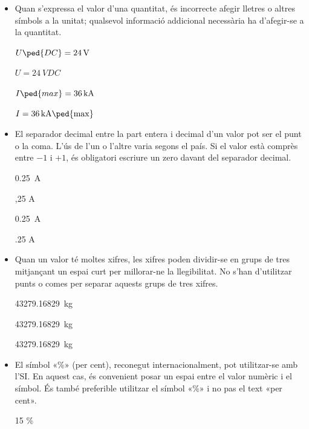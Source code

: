 \begin{itemize}
\textcolor{Red}\faTimesCircle{}   \qty{2,55}{d}

\textcolor{Green}\faCheckSquare{} \ang{22,04}

\textcolor{Blue}\faExclamationTriangle{} \ang{22;2;24}


\item Quan s'expressa el valor d'una quantitat, és incorrecte afegir
lletres o altres símbols a la unitat; qualsevol informació
addicional necessària ha d'afegir-se a la quantitat.

\textcolor{Green}\faCheckSquare{} $U\ped{DC} =\qty{24}{V}$

\textcolor{Red}\faTimesCircle{} $U = \qty{24}{VDC}$

\textcolor{Green}\faCheckSquare{}  $I\ped{max} = \qty{36}{kA}$

\textcolor{Red}\faTimesCircle{}   $I = \qty{36}{kA\ped{max}}$


\item El separador decimal entre la part entera i decimal d'un valor pot ser el punt o la coma. L'ús de l'un o l'altre varia segons el país. Si el valor està comprès entre $-1$ i $+1$, és obligatori escriure un zero davant del separador decimal.

\textcolor{Green}\faCheckSquare{} \qty{0,25}{A}

\textcolor{Red}\faTimesCircle{}  ,25 A

\textcolor{Green}\faCheckSquare{} \qty[output-decimal-marker = {.}]{0.25}{A}

\textcolor{Red}\faTimesCircle{}  .25 A


\item Quan un valor té moltes xifres, les xifres poden dividir-se en grups de tres mitjançant un espai curt per millorar-ne la llegibilitat. No s'han d'utilitzar punts o comes per separar aquests grups de tres xifres.

\textcolor{Green}\faCheckSquare{} \qty{43279,16829}{kg}

\textcolor{Green}\faCheckSquare{} \qty[group-separator =]{43279,16829}{kg}

\textcolor{Red}\faTimesCircle{}  \qty[group-separator = .]{43279,16829}{kg}

\item El símbol «\%» (per cent), reconegut internacionalment, pot utilitzar-se amb l'SI. En aquest cas, és convenient posar un espai entre el valor numèric i el símbol. És també preferible utilitzar el símbol «\%» i no pas el text  «per cent».

\textcolor{Green}\faCheckSquare{} 15 \%


\end{itemize}
